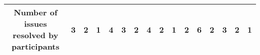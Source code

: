 \begin{table*}[]
\begin{adjustbox}{width=\textwidth,center}
\begin{tabular}{|cll|ccc|ccc|ccc|ccc|ccc|}
\multicolumn{3}{|c|}{\textbf{Number of issues resolved by participants}}                                                                                                                                                                                                                                                                                                 & \multicolumn{1}{c|}{\textbf{3}}                                                                           & \multicolumn{1}{c|}{\textbf{2}}                                                                            & \textbf{1}                                                   & \multicolumn{1}{c|}{\textbf{4}}                                                                           & \multicolumn{1}{c|}{\textbf{3}}                                                                            & \textbf{2}                                                   & \multicolumn{1}{c|}{\textbf{4}}                                                                            & \multicolumn{1}{c|}{\textbf{2}}                                                                            & \textbf{1}                                                   & \multicolumn{1}{c|}{\textbf{2}}                                                                            & \multicolumn{1}{c|}{\textbf{6}}                                                                           & \textbf{2}                                                   & \multicolumn{1}{c|}{\textbf{3}}                                                                            & \multicolumn{1}{c|}{\textbf{2}}                                                                           & \textbf{1}                                                   \\ \hline

\end{tabular}
\end{adjustbox}
\end{table*}
